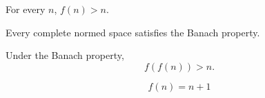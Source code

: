 \begin{lemma}\label{lem:succ}
  For every $n$, $f(n) > n$. %
\end{lemma}
\begin{lemma}[Banach]\label{lem:banach}
  Every complete normed space satisfies the Banach property.
\end{lemma}
\begin{theorem}[Twice]\label{thm:twice}
  Under the Banach property,
  \[ f(f(n)) > n. \]
\end{theorem}
\begin{equation}\label{eq:f}
  f(n) = n + 1
\end{equation}
